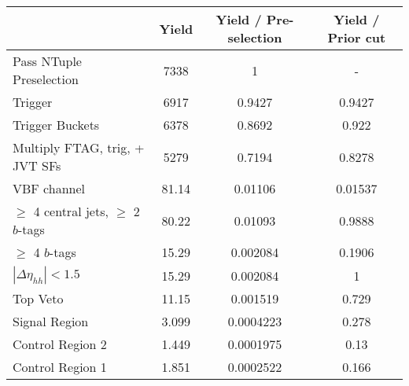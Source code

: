 \begin{table}
{\begin{tabular}{lccc}
\toprule
{} &     Yield &  Yield / Pre-selection &  Yield / Prior cut \\
\midrule
Pass NTuple Preselection               &      7338 &                      1 &                  - \\
Trigger                                &      6917 &                 0.9427 &             0.9427 \\
Trigger Buckets                        &      6378 &                 0.8692 &              0.922 \\
Multiply FTAG, trig, + JVT SFs         &      5279 &                 0.7194 &             0.8278 \\
VBF channel                            &     81.14 &                0.01106 &            0.01537 \\
$\ge$ 4 central jets, $\ge$ 2 $b$-tags &     80.22 &                0.01093 &             0.9888 \\
$\ge$ 4 $b$-tags                       &     15.29 &               0.002084 &             0.1906 \\
$|\Delta\eta_{hh}| < 1.5$              &     15.29 &               0.002084 &                  1 \\
Top Veto                               &     11.15 &               0.001519 &              0.729 \\
Signal Region                          &     3.099 &              0.0004223 &              0.278 \\
Control Region 2                       &     1.449 &              0.0001975 &               0.13 \\
Control Region 1                       &     1.851 &              0.0002522 &              0.166 \\
\bottomrule
\end{tabular}
} \ 
\end{table}